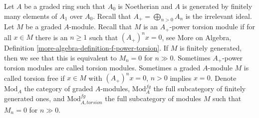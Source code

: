 \noindent
Let $A$ be a graded ring such that $A_0$ is Noetherian and $A$ is generated
by finitely many elements of $A_1$ over $A_0$. Recall that
$A_+ = \bigoplus_{n > 0} A_n$ is the irrelevant ideal.
Let $M$ be a graded $A$-module. Recall that
$M$ is an $A_+$-power torsion module if for all $x \in M$
there is an $n \geq 1$ such that $(A_+)^n x = 0$, see
More on Algebra, Definition \ref{more-algebra-definition-f-power-torsion}.
If $M$ is finitely generated, then we see that
this is equivalent to $M_n = 0$ for $n \gg 0$.
Sometimes $A_+$-power torsion modules are called torsion modules.
Sometimes a graded $A$-module $M$ is called torsion free if
$x \in M$ with $(A_+)^n x = 0$, $n > 0$ implies $x = 0$.
Denote $\text{Mod}_A$ the category of graded $A$-modules,
$\text{Mod}^{fg}_A$ the full subcategory of finitely generated ones,
and $\text{Mod}^{fg}_{A, torsion}$ the full subcategory of
modules $M$ such that $M_n = 0$ for $n \gg 0$.

